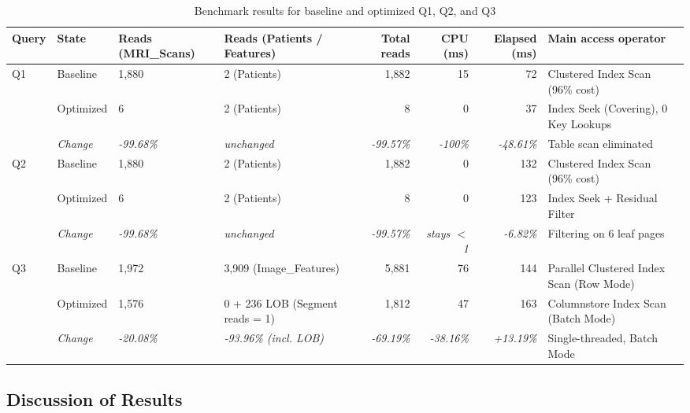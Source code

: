 \begin{table}[H]
\centering
\caption{Benchmark results for baseline and optimized Q1, Q2, and Q3}
\label{tab:benchmark}
\scriptsize
\setlength{\tabcolsep}{3pt}
\begin{tabularx}{\textwidth}{llXXrrrX}
\toprule
\textbf{Query} & \textbf{State} & \textbf{Reads (MRI\_Scans)} & \textbf{Reads (Patients / Features)} & \textbf{Total reads} & \textbf{CPU (ms)} & \textbf{Elapsed (ms)} & \textbf{Main access operator} \\
\midrule
\multirow{3}{*}{Q1}
 & Baseline  & 1,880 & 2 (Patients) & 1,882 & 15 & 72 & Clustered Index Scan (96\% cost) \\
 & Optimized & 6     & 2 (Patients) & 8     & 0  & 37 & Index Seek (Covering), 0 Key Lookups \\
 & \textit{Change} & \textit{-99.68\%} & \textit{unchanged} & \textit{-99.57\%} & \textit{-100\%} & \textit{-48.61\%} & Table scan eliminated \\
\midrule
\multirow{3}{*}{Q2}
 & Baseline  & 1,880 & 2 (Patients) & 1,882 & 0 & 132 & Clustered Index Scan (96\% cost) \\
 & Optimized & 6     & 2 (Patients) & 8     & 0 & 123 & Index Seek + Residual Filter \\
 & \textit{Change} & \textit{-99.68\%} & \textit{unchanged} & \textit{-99.57\%} & \textit{stays $<$1} & \textit{-6.82\%} & Filtering on 6 leaf pages \\
\midrule
\multirow{3}{*}{Q3}
 & Baseline  & 1,972 & 3,909 (Image\_Features) & 5,881 & 76 & 144 & Parallel Clustered Index Scan (Row Mode) \\
 & Optimized & 1,576 & 0 + 236 LOB (Segment reads = 1) & 1,812 & 47 & 163 & Columnstore Index Scan (Batch Mode) \\
 & \textit{Change} & \textit{-20.08\%} & \textit{-93.96\% (incl. LOB)} & \textit{-69.19\%} & \textit{-38.16\%} & \textit{+13.19\%} & Single-threaded, Batch Mode \\
\bottomrule
\end{tabularx}
\end{table}

\subsection{Discussion of Results}

